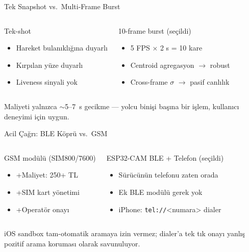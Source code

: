 \documentclass[aspectratio=169,12pt]{beamer}
\begin{document}
\begin{frame}{Tek Snapshot vs.\ Multi-Frame Burst}
    \begin{columns}
        \begin{block}{Tek-shot}
            \begin{itemize}
                \item Hareket bulanıklığına duyarlı
                \item Kırpılan yüze duyarlı
                \item Liveness sinyali yok
            \end{itemize}
        \end{block}
        \begin{block}{10-frame burst (seçildi)}
            \begin{itemize}
                \item 5 FPS × 2 s = 10 kare
                \item Centroid agregasyon $\rightarrow$ robust
                \item Cross-frame $\sigma$ $\rightarrow$ pasif canlılık
            \end{itemize}
        \end{block}
    \end{columns}

    \vspace{0.4cm}
    Maliyeti yalnızca $\sim$5--7~s gecikme --- yolcu binişi başına bir
    işlem, kullanıcı deneyimi için uygun.
\end{frame}

\begin{frame}{Acil Çağrı: BLE Köprü vs.\ GSM}
    \begin{columns}
        \begin{block}{GSM modülü (SIM800/7600)}
            \begin{itemize}
                \item +Maliyet: 250+ TL
                \item +SIM kart yönetimi
                \item +Operatör onayı
            \end{itemize}
        \end{block}
        \begin{block}{ESP32-CAM BLE + Telefon (seçildi)}
            \begin{itemize}
                \item Sürücünün telefonu zaten orada
                \item Ek BLE modülü gerek yok
                \item iPhone: \texttt{tel://}<numara> dialer
            \end{itemize}
        \end{block}
    \end{columns}

    \vspace{0.4cm}
    iOS sandbox tam-otomatik aramaya izin vermez; dialer'a tek tık
    onayı \alert{yanlış pozitif arama koruması} olarak savunuluyor.
\end{frame}
\end{document}
